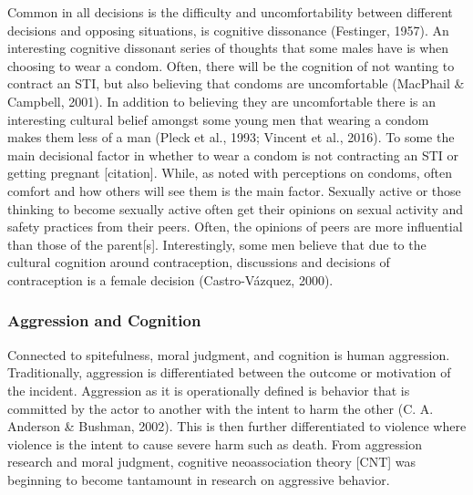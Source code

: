 \documentclass[
  donotrepeattitle,doc, 12pt, a4paper,floatsintext]{apa7}
\begin{document}
Common in all decisions is the difficulty and uncomfortability between different decisions and opposing situations, is cognitive dissonance (Festinger, 1957). An interesting cognitive dissonant series of thoughts that some males have is when choosing to wear a condom. Often, there will be the cognition of not wanting to contract an STI, but also believing that condoms are uncomfortable (MacPhail \& Campbell, 2001). In addition to believing they are uncomfortable there is an interesting cultural belief amongst some young men that wearing a condom makes them less of a man (Pleck et al., 1993; Vincent et al., 2016). To some the main decisional factor in whether to wear a condom is not contracting an STI or getting pregnant {[}citation{]}. While, as noted with perceptions on condoms, often comfort and how others will see them is the main factor. Sexually active or those thinking to become sexually active often get their opinions on sexual activity and safety practices from their peers. Often, the opinions of peers are more influential than those of the parent{[}s{]}. Interestingly, some men believe that due to the cultural cognition around contraception, discussions and decisions of contraception is a female decision (Castro-Vázquez, 2000).

\hypertarget{aggression-and-cognition}{%
\subsubsection{Aggression and Cognition}\label{aggression-and-cognition}}

Connected to spitefulness, moral judgment, and cognition is human aggression. Traditionally, aggression is differentiated between the outcome or motivation of the incident. Aggression as it is operationally defined is behavior that is committed by the actor to another with the intent to harm the other (C. A. Anderson \& Bushman, 2002). This is then further differentiated to violence where violence is the intent to cause severe harm such as death. From aggression research and moral judgment, cognitive neoassociation theory {[}CNT{]} was beginning to become tantamount in research on aggressive behavior.
\end{document}
